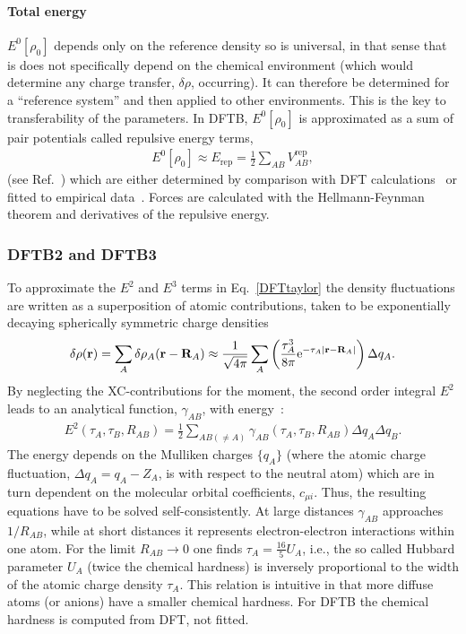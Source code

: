 \documentclass[reprint,onecolumn,superscriptaddress]{revtex4-1}
\begin{document}
\paragraph{Total energy}
$E^0[\rho_0]$ depends only on the reference density so is universal, in that
sense that is does not specifically depend on the chemical environment (which
would determine any charge transfer, $\delta \rho$, occurring). It can
therefore be determined for a ``reference system'' and then applied to other
environments. This is the key to transferability of the parameters. In DFTB,
$E^0[\rho_0]$ is approximated as a sum of pair potentials called repulsive
energy terms,
\begin{eqnarray}
  E^0[\rho_0] \approx E_\text{rep} = \frac{1}{2}\sum_{AB}V^{\text{rep}}_{AB},
  \label{eq:erep}
\end{eqnarray}
(see Ref.~\cite{Seifert2012}) which are either determined by comparison
with DFT calculations~\cite{Porezag1995} or fitted to empirical
data~\cite{Gaus2009}. Forces are calculated with the Hellmann-Feynman theorem and
derivatives of the repulsive energy.


\subsubsection{DFTB2 and DFTB3}
\label{sec:dftb2}
To approximate the $E^2$ and $E^3$ terms in Eq.~\eqref{DFTtaylor} the density
fluctuations are written as a superposition of atomic contributions,
taken to be exponentially decaying spherically symmetric charge densities
\begin{eqnarray}
  \delta\rho(\mathbf{r}) = \sum_A \delta \rho_A(\mathbf{r} - \mathbf{R}_A)
  \approx \frac{1}{\sqrt{4\pi}} \sum_A \left( \frac{\tau_A^3}{8\pi}
  \mathrm{e}^{-\tau_A|\mathbf{r}-\mathbf{R}_A|} \right) \Delta q_A \text.
\end{eqnarray}
By neglecting the XC-contributions for the moment, the second order integral
$E^2$ leads to an analytical function, $\gamma_{AB}$, with
energy~\cite{Elstner1998}:
%
\begin{eqnarray}
  E^2(\tau_A,\tau_B,R_{AB}) = \frac{1}{2}\sum_{AB(\ne A)}
  \gamma_{AB}(\tau_A,\tau_B,R_{AB}) \Delta q_A \Delta q_B.\label{spin2}
\end{eqnarray}
%
The energy depends on the Mulliken charges $\{q_A\}$ (where the atomic charge
fluctuation, $\Delta q_A = q_A - Z_A$, is with respect to the neutral atom)
which are in turn dependent on the molecular orbital coefficients, $c_{\mu
  i}$. Thus, the resulting equations have to be solved self-consistently. At
large distances $\gamma_{AB}$ approaches $1/R_{AB}$, while at short distances it
represents electron-electron interactions within one atom.  For the limit
$R_{AB}\rightarrow 0$ one finds $\tau_A = \frac{16}{5} U_A$, i.e., the so called
Hubbard parameter $U_A$ (twice the chemical hardness) is inversely proportional
to the width of the atomic charge density $\tau_A$. This relation is intuitive
in that more diffuse atoms (or anions) have a smaller chemical hardness. For
DFTB the chemical hardness is computed from DFT, not fitted.
\end{document}
